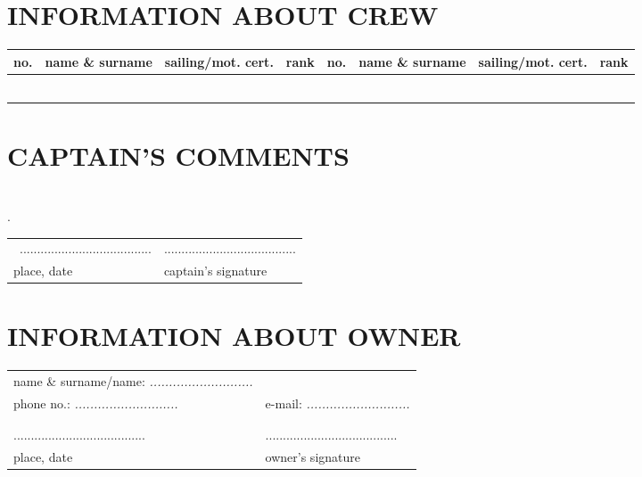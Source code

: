 \documentclass{article}
\begin{document}
\section*{INFORMATION ABOUT CREW}
    \begin{tabular}{|m{}|m{}|m{}|m{}||m{}|m{}|m{}|m{}|}
    \hline
    no. & name \& surname & sailing/mot. cert. & rank & no. & name \& surname &sailing/mot. cert. & rank\\
    \hline
    
&&&&&&&\\
\hline
&&&&&&&\\
\hline
&&&&&&&\\
\hline
&&&&&&&\\
\hline
&&&&&&&\\
\hline
&&&&&&&\\
\hline

    \end{tabular}
    
    
\section*{CAPTAIN'S COMMENTS}


\textit{}\dotfill \\
.\dotfill \\
\begin{tabularx}{\textwidth}{X X}
\\\
...................................... & ......................................\\
place, date & captain's signature\\
\end{tabularx}
\section*{INFORMATION ABOUT OWNER}

\begin{tabularx}{\textwidth}{X X}
name \& surname/name: \textit{...........................} \\
phone no.: \textit{...........................} & e-mail: \textit{...........................}\\
\\\\
...................................... & ......................................\\
place, date & owner's signature\\
\end{tabularx}
\end{document}
